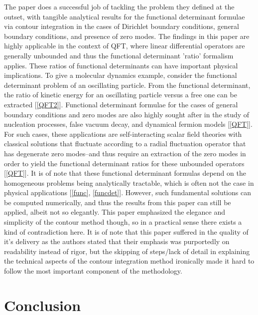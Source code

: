 \documentclass[12]{article}
\begin{document}
The paper does a successful job of tackling the problem they defined at the outset, with tangible analytical results for the functional determinant formulae via contour integration in the cases of Dirichlet boundary conditions, general boundary conditions, and presence of zero modes. The findings in this paper are highly applicable in the context of QFT, where linear differential operators are generally unbounded and thus the functional determinant 'ratio' formalism applies. These ratios of functional determinants can have important physical implications. To give a molecular dynamics example, consider the functional determinant problem of an oscillating particle. From the functional determinant, the ratio of kinetic energy for an oscillating particle versus a free one can be extracted [\ref{QFT2}]. Functional determinant formulae for the cases of general boundary conditions and zero modes are also highly sought after in the study of nucleation processes, false vacuum decay, and dynamical fermion models [\ref{QFT}]. For such cases, these applications are self-interacting scalar field theories with classical solutions that fluctuate according to a radial fluctuation operator that has degenerate zero modes--and thus require an extraction of the zero modes in order to yield the functional determinant ratios for these unbounded operators [\ref{QFT}]. It is of note that these functional determinant formulas depend on the homogeneous problems being analytically tractable, which is often not the case in physical applications [\ref{func}, \ref{funcdet}]. However, such fundamental solutions can be computed numerically, and thus the results from this paper can still be applied, albeit not so elegantly. This paper emphasized the elegance and simplicity of the contour method though, so in a practical sense there exists a kind of contradiction here. It is of note that this paper suffered in the quality of it's delivery as the authors stated that their emphasis was purportedly on readability instead of rigor, but the skipping of steps/lack of detail in explaining the technical aspects of the contour integration method ironically made it hard to follow the most important component of the methodology. 



\section{Conclusion}
\end{document}
